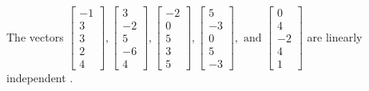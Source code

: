 \begin{exercise}
\begin{exerciseStatement}
  \end{exerciseStatement}
  \begin{exerciseAnswer}
   The vectors \(\left[\begin{array}{r}
-1 \\
3 \\
3 \\
2 \\
4
\end{array}\right] , \left[\begin{array}{r}
3 \\
-2 \\
5 \\
-6 \\
4
\end{array}\right] , \left[\begin{array}{r}
-2 \\
0 \\
5 \\
3 \\
5
\end{array}\right] , \left[\begin{array}{r}
5 \\
-3 \\
0 \\
5 \\
-3
\end{array}\right] , \text{ and } \left[\begin{array}{r}
0 \\
4 \\
-2 \\
4 \\
1
\end{array}\right]\) are 
  	 linearly independent  .
  


  \end{exerciseAnswer}
\end{exercise}
